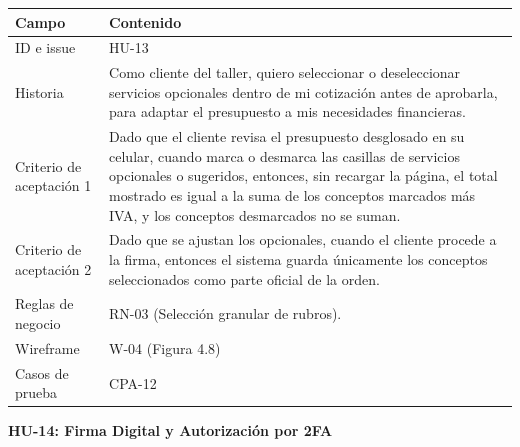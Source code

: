 {\def\LTcaptype{none} %
\begin{longtable}[]{@{}
  >{\raggedright\arraybackslash}p{}
  >{\raggedright\arraybackslash}p{}@{}}
\toprule\noalign{}
\begin{minipage}[b]{\linewidth}\raggedright
\textbf{Campo}
\end{minipage} & \begin{minipage}[b]{\linewidth}\raggedright
\textbf{Contenido}
\end{minipage} \\
\midrule\noalign{}
\endhead
\bottomrule\noalign{}
\endlastfoot
ID e issue & HU-13 \\
Historia & Como cliente del taller, quiero seleccionar o deseleccionar
servicios opcionales dentro de mi cotización antes de aprobarla, para
adaptar el presupuesto a mis necesidades financieras. \\
Criterio de aceptación 1 & Dado que el cliente revisa el presupuesto
desglosado en su celular, cuando marca o desmarca las casillas de
servicios opcionales o sugeridos, entonces, sin recargar la página, el
total mostrado es igual a la suma de los conceptos marcados más IVA, y
los conceptos desmarcados no se suman. \\
Criterio de aceptación 2 & Dado que se ajustan los opcionales, cuando el
cliente procede a la firma, entonces el sistema guarda únicamente los
conceptos seleccionados como parte oficial de la orden. \\
Reglas de negocio & RN-03 (Selección granular de rubros). \\
Wireframe & W-04 (Figura 4.8) \\
Casos de prueba & CPA-12 \\
\end{longtable}
}

\textbf{HU-14: Firma Digital y Autorización por 2FA}

